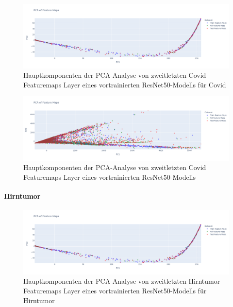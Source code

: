 \begin{figure}[H]
    \centering
    \includegraphics[width=\linewidth]{01-images/06-ending/covidx-all-feautremap-pca-ourmodel-resnet50.png}
    \caption{Hauptkomponenten der PCA-Analyse von zweitletzten Covid Featuremaps Layer eines vortrainierten ResNet50-Modells für Covid}
    \label{fig:covidx-feautremap-pca-ourmodel-resnet50}
\end{figure}

\begin{figure}[H]
    \centering
    \includegraphics[width=\linewidth]{01-images/06-ending/covidx-all-feautremap-pca-model-resnet50.png}
    \caption{Hauptkomponenten der PCA-Analyse von zweitletzten Covid Featuremaps Layer eines vortrainierten ResNet50-Modells}
    \label{fig:covidx-feautremap-pca-model-resnet50}
\end{figure}


\paragraph*{Hirntumor}

\begin{figure}[H]
    \centering
    \includegraphics[width=\linewidth]{01-images/06-ending/brain-all-feautremap-pca-ourmodel-resnet50.png}
    \caption{Hauptkomponenten der PCA-Analyse von zweitletzten Hirntumor Featuremaps Layer eines vortrainierten ResNet50-Modells für Hirntumor}
    \label{fig:brain-feautremap-pca-ourmodel-resnet50}
\end{figure}

